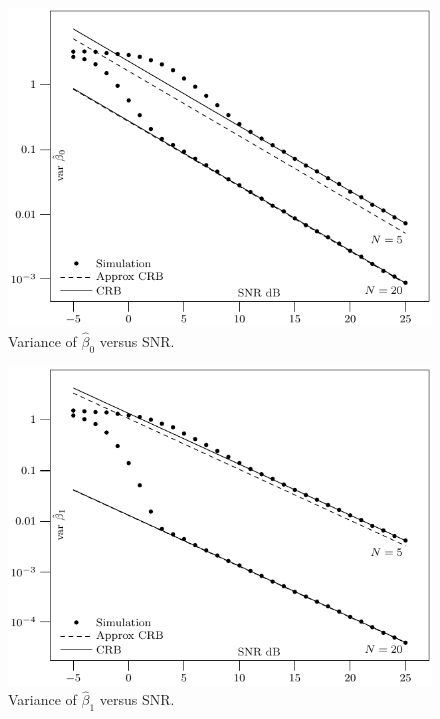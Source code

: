 \documentclass[review]{elsarticle}
\begin{document}
 \begin{figure}[p]
    	\centering 
   		\includegraphics{fig1.pdf} 
    		\caption{Variance of $\hat{\beta}_0$ versus SNR.} 
    		\label{plot:phase0} 
 \end{figure} 

\clearpage

 \begin{figure}[p]
    	\centering 
   		\includegraphics{fig2.pdf} 
    		\caption{Variance of $\hat{\beta}_1$ versus SNR.} 
    		\label{plot:phase1} 
 \end{figure} 

\clearpage
\end{document}
